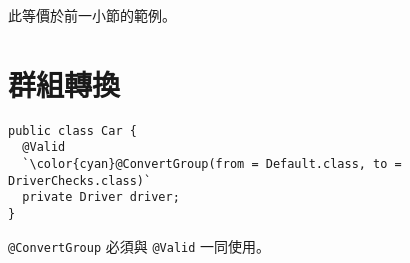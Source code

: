 此等價於前一小節的範例。

\section{群組轉換}

\begin{lstlisting}
public class Car {
  @Valid
  `\color{cyan}@ConvertGroup(from = Default.class, to = DriverChecks.class)`
  private Driver driver;
}
\end{lstlisting}

\texttt{@ConvertGroup} 必須與 \texttt{@Valid} 一同使用。